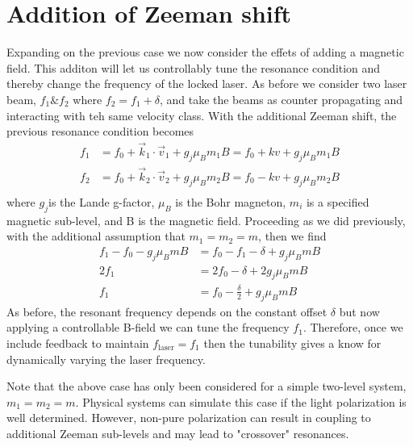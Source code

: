 \section{Addition of Zeeman shift}
Expanding on the previous case we now consider the effets of adding a magnetic field.
This additon will let us controllably tune the resonance condition and thereby change the frequency of the locked laser.
As before we consider two laser beam, $f_1 \& f_2$ where $f_2 = f_1 + \delta$, and take the beams as counter propagating and interacting with teh same velocity class.
With the additional Zeeman shift, the previous resonance condition becomes
\begin{equation}
\begin{split}
	f_1 &= f_0 +  \vec{k}_1 \cdot \vec{v}_1 + g_j \mu_B m_1 B = f_0 + k v + g_j \mu_B m_1 B \\
	f_2 &= f_0 +  \vec{k}_2 \cdot \vec{v}_2 + g_j \mu_B m_2 B = f_0 - k v + g_j \mu_B m_2 B \\
\end{split}
\end{equation}
where $g_j$is the Lande g-factor, $\mu_B$ is the Bohr magneton, $m_i$ is a specified magnetic sub-level, and B is the magnetic field.
Proceeding as we did previously, with the additional assumption that $m_1=m_2=m$, then we find
\begin{equation}
\begin{split}
	f_1 - f_0 - g_j \mu_B mB &= f_0 - f_1 - \delta + g_j \mu_B mB \\
		 2f_1 &= 2f_0 - \delta + 2 g_j \mu_B mB \\
  f_1  &=   f_0 - \frac{\delta}{2} + g_j \mu_B mB
\end{split}
\end{equation}
As before, the resonant frequency depends on the constant offset $\delta$ but now applying a controllable B-field we can tune the frequency $f_1$.
Therefore, once we include feedback to maintain $f_{\text{laser}}=f_1$ then the tunability gives a know for dynamically varying the laser frequency.

Note that the above case has only been considered for a simple two-level system, $m_1=m_2=m$.
Physical systems can simulate this case if the light polarization is well determined.
However, non-pure polarization can result in coupling to additional Zeeman sub-levels and may lead to "crossover" resonances.
